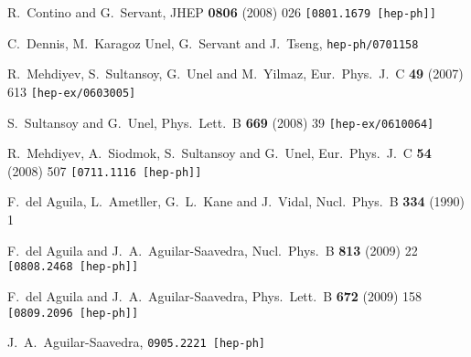 \documentclass[12pt,a4paper]{article}
\begin{document}
\begin{thebibliography}{99}
  R.~Contino and G.~Servant,
  JHEP {\bf 0806} (2008) 026
  {\tt [0801.1679 [hep-ph]]}

  C.~Dennis, M.~Karagoz Unel, G.~Servant and J.~Tseng,
  {\tt hep-ph/0701158}

  R.~Mehdiyev, S.~Sultansoy, G.~Unel and M.~Yilmaz,
  Eur.\ Phys.\ J.\  C {\bf 49} (2007) 613
  {\tt [hep-ex/0603005]}

  S.~Sultansoy and G.~Unel,
  Phys.\ Lett.\  B {\bf 669} (2008) 39
  {\tt [hep-ex/0610064]}

  R.~Mehdiyev, A.~Siodmok, S.~Sultansoy and G.~Unel,
  Eur.\ Phys.\ J.\  C {\bf 54} (2008) 507
  {\tt [0711.1116 [hep-ph]]}

  F.~del Aguila, L.~Ametller, G.~L.~Kane and J.~Vidal,
  Nucl.\ Phys.\  B {\bf 334} (1990) 1


  F.~del Aguila and J.~A.~Aguilar-Saavedra,
  Nucl.\ Phys.\  B {\bf 813} (2009) 22
  {\tt [0808.2468 [hep-ph]]}

  F.~del Aguila and J.~A.~Aguilar-Saavedra,
  Phys.\ Lett.\  B {\bf 672} (2009) 158
  {\tt [0809.2096 [hep-ph]]}

  J.~A.~Aguilar-Saavedra,
  {\tt 0905.2221 [hep-ph]}


\end{thebibliography}
\end{document}
